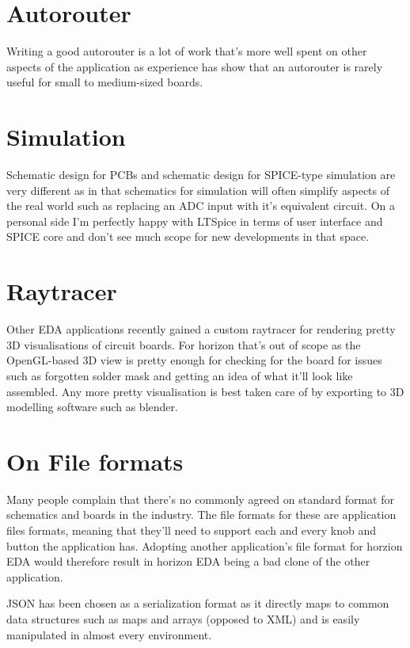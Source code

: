 \documentclass[letterpaper,10pt,czech]{sphinxmanual}
\begin{document}
\section{Autorouter}
\label{\detokenize{non-goals:autorouter}}
Writing a good autorouter is a lot of work that’s more well spent on
other aspects of the application as experience has show that an
autorouter is rarely useful for small to medium-sized boards.


\section{Simulation}
\label{\detokenize{non-goals:simulation}}
Schematic design for PCBs and schematic design for SPICE-type
simulation are very different as in that schematics for simulation will
often simplify aspects of the real world such as replacing an ADC input
with it’s equivalent circuit. On a personal side I’m perfectly happy
with LTSpice in terms of user interface and SPICE core and don’t see much
scope for new developments in that space.


\section{Raytracer}
\label{\detokenize{non-goals:raytracer}}
Other EDA applications recently gained a custom raytracer for rendering
pretty 3D visualisations of circuit boards. For horizon that’s out of
scope as the OpenGL-based 3D view is pretty enough for checking for the
board for issues such as forgotten solder mask and getting an idea of
what it’ll look like assembled. Any more pretty visualisation is best
taken care of by exporting to 3D modelling software such as blender.


\section{On File formats}
\label{\detokenize{non-goals:on-file-formats}}
Many people complain that there’s no commonly agreed on standard format
for schematics and boards in the industry. The file formats for these
are application files formats, meaning that they’ll need to support
each and every knob and button the application has. Adopting another
application’s file format for horzion EDA would therefore result in
horizon EDA being a bad clone of the other application.

JSON has been chosen as a serialization format as it directly maps to
common data structures such as maps and arrays (opposed to XML) and is
easily manipulated in almost every environment.
\end{document}
